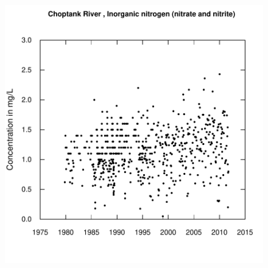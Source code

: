 \documentclass[a4paper,11pt]{article}
\begin{document}
\begin{figure}[htbp]
  \begin{minipage}[h]{0.5\linewidth}
    \begin{center}

\includegraphics{EGRET-figplotConcTime}
    \label{fig:plotConcTime}
    \end{center}
  \end{minipage}
  \begin{minipage}[h]{0.5\linewidth}
    \begin{center}



\end{center}
\end{minipage}
\end{figure}
\end{document}
